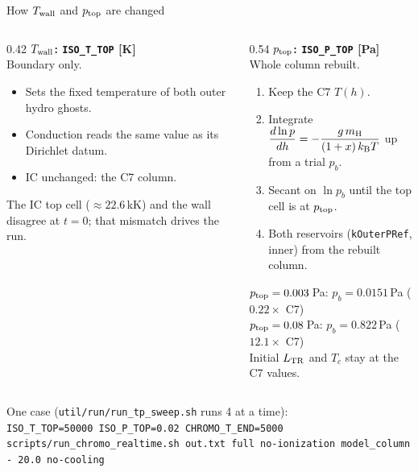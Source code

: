 \documentclass[aspectratio=169,10pt]{beamer}
\newcommand{\Twall}{T_{\rm wall}}
\newcommand{\ptop}{p_{\rm top}}
\newcommand{\LTR}{L_{\rm TR}}
\newcommand{\kB}{k_{\rm B}}
\newcommand{\mH}{m_{\rm H}}
\begin{document}
\begin{frame}{How $\Twall$ and $\ptop$ are changed}
  \begin{columns}[T]
    \begin{column}{0.42\textwidth}
      \textbf{$\Twall$: \texttt{ISO\_T\_TOP} [K]}\\[4pt]
      \small
      Boundary only.
      \begin{itemize}\itemsep4pt
        \item Sets the fixed temperature of both outer hydro ghosts.
        \item Conduction reads the same value as its Dirichlet datum.
        \item IC unchanged: the C7 column.
      \end{itemize}
      \vspace{4pt}
      The IC top cell ($\approx 22.6$\,kK) and the wall disagree at $t=0$;
      that mismatch drives the run.
    \end{column}
    \begin{column}{0.54\textwidth}
      \textbf{$\ptop$: \texttt{ISO\_P\_TOP} [Pa]}\\[4pt]
      \small
      Whole column rebuilt.
      \begin{enumerate}\itemsep3pt
        \item Keep the C7 $T(h)$.
        \item Integrate $\dfrac{d\ln p}{dh} = -\dfrac{g\,\mH}{(1+x)\,\kB T}$
              up from a trial $p_b$.
        \item Secant on $\ln p_b$ until the top cell is at $\ptop$.
        \item Both reservoirs (\texttt{kOuterPRef}, inner) from the rebuilt
              column.
      \end{enumerate}
      \vspace{3pt}
      \footnotesize
      $\ptop = 0.003$\,Pa: $p_b = 0.0151$\,Pa ($0.22\times$ C7)\\
      $\ptop = 0.08$\,Pa: $p_b = 0.822$\,Pa ($12.1\times$ C7)\\[3pt]
      Initial $\LTR$ and $T_c$ stay at the C7 values.
    \end{column}
  \end{columns}
  \vspace{8pt}
  \scriptsize One case (\texttt{util/run/run\_tp\_sweep.sh} runs 4 at a time):\\[2pt]
  \texttt{ISO\_T\_TOP=50000 ISO\_P\_TOP=0.02 CHROMO\_T\_END=5000 scripts/run\_chromo\_realtime.sh
    out.txt full no-ionization model\_column - 20.0 no-cooling}
\end{frame}
\end{document}
